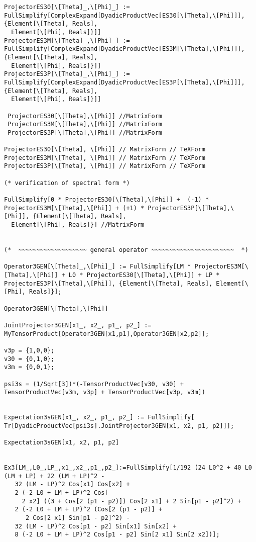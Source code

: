 \documentclass[%
  twocolumn,
 showpacs,
 showkeys,
 preprintnumbers,
 amsmath,amssymb,
 aps,
  pra,
  longbibliography,
 floatfix,
 ]{revtex4-1}
\begin{document}
{\begin{lstlisting}[backgroundcolor=\color{yellow!10},framerule=0pt,breaklines=true, frame=tb]
ProjectorES30[\[Theta]_,\[Phi]_] := FullSimplify[ComplexExpand[DyadicProductVec[ES30[\[Theta],\[Phi]]], {Element[\[Theta], Reals],
  Element[\[Phi], Reals]}]]
ProjectorES3M[\[Theta]_,\[Phi]_] := FullSimplify[ComplexExpand[DyadicProductVec[ES3M[\[Theta],\[Phi]]], {Element[\[Theta], Reals],
  Element[\[Phi], Reals]}]]
ProjectorES3P[\[Theta]_,\[Phi]_] := FullSimplify[ComplexExpand[DyadicProductVec[ES3P[\[Theta],\[Phi]]], {Element[\[Theta], Reals],
  Element[\[Phi], Reals]}]]

 ProjectorES30[\[Theta],\[Phi]] //MatrixForm
 ProjectorES3M[\[Theta],\[Phi]] //MatrixForm
 ProjectorES3P[\[Theta],\[Phi]] //MatrixForm

ProjectorES30[\[Theta], \[Phi]] // MatrixForm // TeXForm
ProjectorES3M[\[Theta], \[Phi]] // MatrixForm // TeXForm
ProjectorES3P[\[Theta], \[Phi]] // MatrixForm // TeXForm

(* verification of spectral form *)

FullSimplify[0 * ProjectorES30[\[Theta],\[Phi]] +  (-1) * ProjectorES3M[\[Theta],\[Phi]] + (+1) * ProjectorES3P[\[Theta],\[Phi]], {Element[\[Theta], Reals],
  Element[\[Phi], Reals]}] //MatrixForm


(*  ~~~~~~~~~~~~~~~~~~~ general operator ~~~~~~~~~~~~~~~~~~~~~~~  *)

Operator3GEN[\[Theta]_,\[Phi]_] := FullSimplify[LM * ProjectorES3M[\[Theta],\[Phi]] + L0 * ProjectorES30[\[Theta],\[Phi]] + LP * ProjectorES3P[\[Theta],\[Phi]], {Element[\[Theta], Reals], Element[\[Phi], Reals]}];

Operator3GEN[\[Theta],\[Phi]]

JointProjector3GEN[x1_, x2_, p1_, p2_] :=  MyTensorProduct[Operator3GEN[x1,p1],Operator3GEN[x2,p2]];

v3p = {1,0,0};
v30 = {0,1,0};
v3m = {0,0,1};

psi3s = (1/Sqrt[3])*(-TensorProductVec[v30, v30] + TensorProductVec[v3m, v3p] + TensorProductVec[v3p, v3m])


Expectation3sGEN[x1_, x2_, p1_, p2_] := FullSimplify[ Tr[DyadicProductVec[psi3s].JointProjector3GEN[x1, x2, p1, p2]]];

Expectation3sGEN[x1, x2, p1, p2]


Ex3[LM_,L0_,LP_,x1_,x2_,p1_,p2_]:=FullSimplify[1/192 (24 L0^2 + 40 L0 (LM + LP) + 22 (LM + LP)^2 -
   32 (LM - LP)^2 Cos[x1] Cos[x2] +
   2 (-2 L0 + LM + LP)^2 Cos[
     2 x2] ((3 + Cos[2 (p1 - p2)]) Cos[2 x1] + 2 Sin[p1 - p2]^2) +
   2 (-2 L0 + LM + LP)^2 (Cos[2 (p1 - p2)] +
      2 Cos[2 x1] Sin[p1 - p2]^2) -
   32 (LM - LP)^2 Cos[p1 - p2] Sin[x1] Sin[x2] +
   8 (-2 L0 + LM + LP)^2 Cos[p1 - p2] Sin[2 x1] Sin[2 x2])];


\end{lstlisting}}
\end{document}
